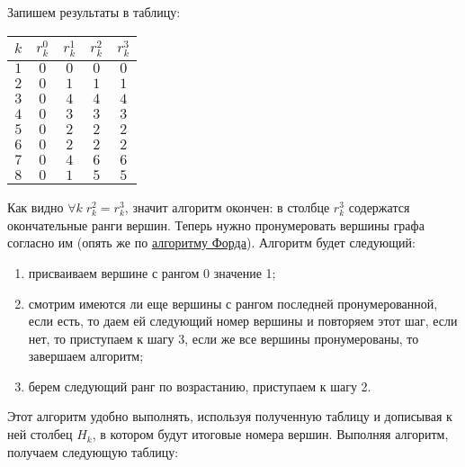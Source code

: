 \begin{itemize}[nosep]
	\bigskip

	Запишем результаты в таблицу:

	\begin{table}[H]
		\centering
		\begin{tabular}{ | c | c | c | c | c | } 
			\hline
			$k$ & $r_k^0$ & $r_k^1$ & $r_k^2$ & $r_k^3$ \\ \hline
			$1$ & $0$ & $0$ & $0$ & $0$ \\ \hline
			$2$ & $0$ & $1$ & $1$ & $1$ \\ \hline
			$3$ & $0$ & $4$ & $4$ & $4$ \\ \hline
			$4$ & $0$ & $3$ & $3$ & $3$ \\ \hline
			$5$ & $0$ & $2$ & $2$ & $2$ \\ \hline
			$6$ & $0$ & $2$ & $2$ & $2$ \\ \hline
			$7$ & $0$ & $4$ & $6$ & $6$ \\ \hline
			$8$ & $0$ & $1$ & $5$ & $5$ \\ \hline
		\end{tabular}
	\end{table}

	Как видно $\forall k \; r_k^2 = r_k^3$, значит алгоритм окончен: в столбце $r^3_k$ содержатся окончательные ранги вершин. Теперь нужно пронумеровать вершины графа согласно им (опять же по \hyperref[alg:ford]{алгоритму Форда}). Алгоритм будет следующий:
	
	\begin{enumerate}[nosep]
		\item присваиваем вершине с рангом 0 значение 1;
		\item смотрим имеются ли еще вершины с рангом последней пронумерованной, если есть, то даем ей следующий номер вершины и повторяем этот шаг, если нет, то приступаем к шагу 3, если же все вершины пронумерованы, то завершаем алгоритм;
		\item берем следующий ранг по возрастанию, приступаем к шагу 2.
	\end{enumerate}
	
	Этот алгоритм удобно выполнять, используя полученную таблицу и дописывая к ней столбец $H_k$, в котором будут итоговые номера вершин. Выполняя алгоритм, получаем следующую таблицу:
	

\end{itemize}
